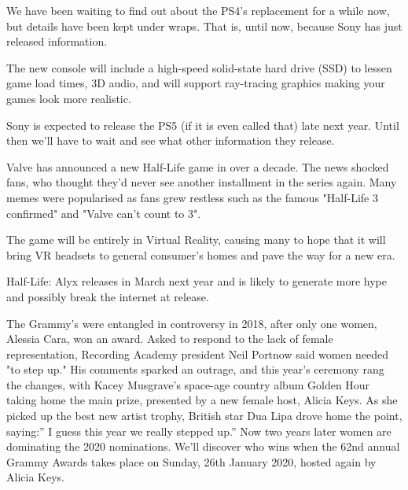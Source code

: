 \documentclass{article}
\begin{document}
\begin{multicols}{2}
We have been waiting to find out about the PS4's replacement for a while now, but details have been kept under wraps. That is, until now, because Sony has just released information.

The new console will include a high-speed solid-state hard drive (SSD) to lessen game load times, 3D audio, and will support ray-tracing graphics making your games look more realistic.

Sony is expected to release the PS5 (if it is even called that) late next year. Until then we'll have to wait and see what other information they release.


    Valve has announced a new Half-Life game in over a decade. The news shocked fans, who thought they'd never see another installment in the series again. Many memes were popularised as fans grew restless such as the famous "Half-Life 3 confirmed" and "Valve can't count to 3".
    
    The game will be entirely in Virtual Reality, causing many to hope that it will bring VR headsets to general consumer's homes and pave the way for a new era. 
    
    Half-Life: Alyx releases in March next year and is likely to generate more hype and possibly break the internet at release.


\end{multicols}
\closearticle

\begin{center}

\end{center}

\pagebreak



\begin{multicols}{2}

The Grammy’s were entangled in controversy in 2018, after only one women, Alessia Cara, won an award. Asked to respond to the lack of female representation, Recording Academy president Neil Portnow said women needed "to step up." His comments sparked an outrage, and this year’s ceremony rang the changes, with Kacey Musgrave’s space-age country album Golden Hour taking home the main prize, presented by a new female host, Alicia Keys. As she picked up the best new artist trophy, British star Dua Lipa drove home the point, saying:” I guess this year we really stepped up.” Now two years later women are dominating the 2020 nominations. We’ll discover who wins when the 62nd annual Grammy Awards takes place on Sunday, 26th January 2020, hosted again by Alicia Keys.

\pagebreak


\end{multicols}
\end{document}
